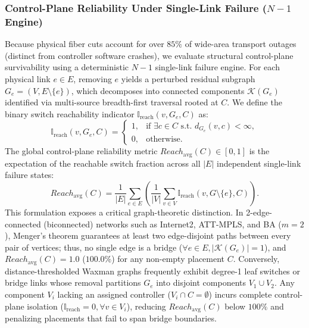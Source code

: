\documentclass[conference]{IEEEtran}
\begin{document}
\subsubsection{Control-Plane Reliability Under Single-Link Failure ($N-1$ Engine)}
Because physical fiber cuts account for over $85\%$ of wide-area transport outages (distinct from controller software crashes), we evaluate structural control-plane survivability using a deterministic $N-1$ single-link failure engine. For each physical link $e \in E$, removing $e$ yields a perturbed residual subgraph $G_e = (V, E \setminus \{e\})$, which decomposes into connected components $\mathcal{K}(G_e)$ identified via multi-source breadth-first traversal rooted at $C$. We define the binary switch reachability indicator $\mathbb{I}_{\text{reach}}(v, G_e, C)$ as:
\begin{equation}
\mathbb{I}_{\text{reach}}(v, G_e, C) = \begin{cases} 1, & \text{if } \exists c \in C \text{ s.t. } d_{G_e}(v, c) < \infty, \\ 0, & \text{otherwise.} \end{cases}
\label{eq:indicator}
\end{equation}
The global control-plane reliability metric $Reach_{\text{avg}}(C) \in [0, 1]$ is the expectation of the reachable switch fraction across all $|E|$ independent single-link failure states:
\begin{equation}
Reach_{\text{avg}}(C) = \frac{1}{|E|} \sum_{e \in E} \left( \frac{1}{|V|} \sum_{v \in V} \mathbb{I}_{\text{reach}}(v, G \setminus \{e\}, C) \right).
\label{eq:reachability}
\end{equation}
This formulation exposes a critical graph-theoretic distinction. In 2-edge-connected (biconnected) networks such as Internet2, ATT-MPLS, and BA ($m=2$), Menger's theorem guarantees at least two edge-disjoint paths between every pair of vertices; thus, no single edge is a bridge ($\forall e \in E, |\mathcal{K}(G_e)| = 1$), and $Reach_{\text{avg}}(C) = 1.0$ ($100.0\%$) for any non-empty placement $C$. Conversely, distance-thresholded Waxman graphs frequently exhibit degree-1 leaf switches or bridge links whose removal partitions $G_e$ into disjoint components $V_1 \cup V_2$. Any component $V_i$ lacking an assigned controller ($V_i \cap C = \emptyset$) incurs complete control-plane isolation ($\mathbb{I}_{\text{reach}} = 0, \forall v \in V_i$), reducing $Reach_{\text{avg}}(C)$ below $100\%$ and penalizing placements that fail to span bridge boundaries.
\end{document}
